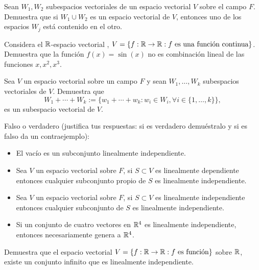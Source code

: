 \documentclass[12pt,a4paper]{book}
\newcommand{\llaves}[1]{\{#1\}}
\newcommand{\llavesgrande}[1]{\big\{#1\big\}}
\begin{document}
    \begin{ejercicio}
        Sean $W_1, W_2$ subespacios vectoriales de un espacio vectorial $V$ sobre el campo $F$. Demuestra que si $W_1 \cup W_2$ es un espacio vectorial de $V$, entonces uno de los espacios $W_j$ está contenido en el otro.
    \end{ejercicio}

    \begin{ejercicio}
        Considera el $\mathbb{R}$-espacio vectorial , $V = \llaves{f:\R \to \R : f \text{ es una función continua}}$. Demuestra que la función $f(x) = \sin (x)$ no es combinación lineal de las funciones $x, x^2, x^3$.
    \end{ejercicio}

    \begin{ejercicio}
        Sea $V$ un espacio vectorial sobre un campo $F$ y sean $W_1, \dots , W_k$ subespacios vectoriales de $V$. Demuestra que
        \[
        W_1 + \dotsi + W_k := \llavesgrande{ w_1 + \dotsi + w_k: w_i \in W_i, \forall i \in \{1, \dots, k \}},
        \]
        es un subespacio vectorial de $V$.
    \end{ejercicio}

    \begin{ejercicio}
        Falso o verdadero (justifica tus respuestas: si es verdadero demuéstralo y si es falso da un contraejemplo):
        \begin{itemize}
            \item[(a)] El vacío es un subconjunto linealmente independiente.
            \item[(b)] Sea $V$ un espacio vectorial sobre $F$, si $S \subset V$ es linealmente dependiente entonces cualquier subconjunto propio de $S$ es linealmente independiente.
            \item[(c)] Sea $V$ un espacio vectorial sobre $F$, si $S \subset V$ es linealmente independiente entonces cualquier subconjunto de $S$ es linealmente independiente.
            \item[(d)] Si un conjunto de cuatro vectores en $\mathbb{R}^4$ es linealmente independiente, entonces necesariamente genera a $\mathbb{R}^4$.
        \end{itemize}
    \end{ejercicio}

    \begin{ejercicio}
        Demuestra que el espacio vectorial $V = \llaves{f: \R \to \R: f \text{ es función}}$ sobre $\mathbb{R}$, existe un conjunto infinito que es linealmente independiente.
    \end{ejercicio}
\end{document}
